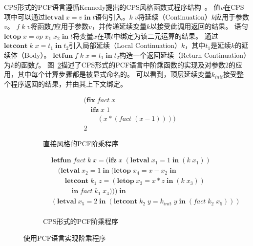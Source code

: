 CPS形式的PCF语言遵循Kennedy提出的CPS风格函数式程序结构~\cite{kennedy2007compiling}。
值$v$在CPS项中可以通过$\mathbf{letval}\; x = v\; \mathbf{in}\; t$语句引入。$k\; v$将延续（Continuation）$k$应用于参数$v$。
$f\; k\; v$将函数$f$应用于参数$v$，并传递延续变量$k$以接受此调用返回的结果。
语句$\mathbf{letop}\; x = op\; x_1\; x_2\; \mathbf{in}\; t$将变量$x$在项$t$中绑定为该二元运算的结果。
通过$\mathbf{letcont}\; k\; x = t_1\; \mathbf{in}\; t_2$引入局部延续（Local Continuation）$k$，其中$t_1$是延续$k$的延续体（Body）。
$\mathbf{letfun}\; f\; k\; x = t_1\; \mathbf{in}\; t_2$构造一个返回延续（Return Continuation）为$k$的函数$f$。
图~\ref{factcps}描述了CPS形式的PCF语言中阶乘函数的实现及对参数2的应用，其中每个计算步骤都是被显式命名的。
可以看到，顶层延续变量$k_{init}$接受整个程序返回的结果，并由其上下文绑定。

\begin{figure}[htbp]
        \centering
        \begin{subfigure}[b]{0.3\textwidth}
            \flushright
        \begin{equation}
            \nonumber
            \begin{aligned}
            & (\mathbf{fix}\; fact\; x \\
            & \quad \mathbf{ifz}\; x\; 1 \\
            & \quad\quad (x*(fact\; (x-1)))) \\
            & 2
            \end{aligned}
        \end{equation}
        \caption{直接风格的PCF阶乘程序}\label{factpcf}
        \end{subfigure}
        \begin{subfigure}[b]{0.68\textwidth}
            \flushleft
        \begin{equation}
            \nonumber
            \begin{aligned}
            & \mathbf{letfun}\; fact\; k\; x = (\mathbf{ifz}\; x\; (\mathbf{letval}\; x_1=1\; \mathbf{in}\; (k\; x_1))\\
            & \quad (\mathbf{letval}\; x_2=1\; \mathbf{in}\; (\mathbf{letop}\; x_4=x-x_2\; \mathbf{in} \\
            & \quad\quad \mathbf{letcont}\; k_1\; z= (\mathbf{letop}\; x_3=x*z\; \mathbf{in}\; (k\; x_3))\\
            & \quad\quad\quad  \mathbf{in}\; fact\; k_1\; x_4)))\; \mathbf{in} \\
            & (\mathbf{letval}\; x_5=2\; \mathbf{in}\; (\mathbf{letcont}\; k_2\; y=k_{init}\; y\; \mathbf{in}\; (fact\; k_2\; x_5))) \\
            \end{aligned}
        \end{equation}
        \caption{CPS形式的PCF阶乘程序}\label{factcps}
        \end{subfigure}
    \caption{使用PCF语言实现阶乘程序}\label{factpcfcps}
    \end{figure}

